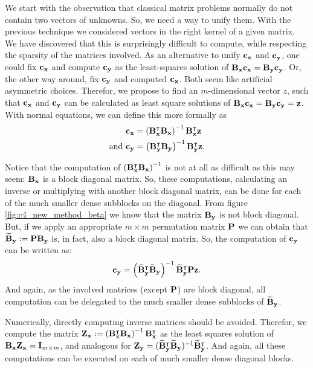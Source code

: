 We start with the observation that classical matrix problems normally do not contain two vectors of unknowns. So, we need a way to unify them. With the previous technique we considered vectors in the right kernel of a given matrix. We have discovered that this is surprisingly difficult to compute, while respecting the sparsity of the matrices involved. As an alternative to unify $\vb{c_x}$ and $\vb{c_y}$, one could fix $\vb{c_x}$ and compute $\vb{c_y}$ as the least-squares solution of $\vb{B_x}\vb{c_x} = \vb{B_y}\vb{c_y}$. Or, the other way around, fix $\vb{c_y}$ and computed $\vb{c_x}$. Both seem like artificial asymmetric choices. Therefor, we propose to find an $m$-dimensional vector $z$, such that $\vb{c_x}$ and $\vb{c_y}$ can be calculated as least square solutions of $\vb{B_x}\vb{c_x} = \vb{B_y}\vb{c_y} = \vb{z}$. With normal equations, we can define this more formally as
\begin{align*}
    \vb{c_x}            & = \left(\vb{B_x^\intercal} \vb{B_x}\right)^{-1} \vb{B_x^\intercal} \vb{z}          \\
    \text{and }\vb{c_y} & = \left(\vb{B_y^\intercal} \vb{B_y}\right)^{-1} \vb{B_y^\intercal} \vb{z} \text{.}
\end{align*}

Notice that the computation of $\left(\vb{B_x^\intercal} \vb{B_x}\right)^{-1}$ is not at all as difficult as this may seem: $\vb{B_x}$ is a block diagonal matrix. So, these computations, calculating an inverse or multiplying with another block diagonal matrix, can be done for each of the much smaller dense subblocks on the diagonal. From figure \ref{fig:c4_new_method_beta} we know that the matrix $\vb{B_y}$ is not block diagonal. But, if we apply an appropriate $m \times m$ permutation matrix $\vb{P}$ we can obtain that $\vb{\widetilde{B}_y} := \vb{P} \vb{B_y}$ is, in fact, also a block diagonal matrix. So, the computation of $\vb{c_y}$ can be written as:
$$
    \vb{c_y} = \left(\vb{\widetilde{B}_y^\intercal} \vb{\widetilde{B}_y}\right)^{-1} \vb{\widetilde{B}^\intercal_y} \vb{P} \vb{z} \text{.}
$$
And again, as the involved matrices (except $\vb{P}$) are block diagonal, all computation can be delegated to the much smaller dense subblocks of $\vb{\widetilde{B}_y}$.

Numerically, directly computing inverse matrices should be avoided. Therefor, we compute the matrix $\vb{Z_x} := \left(\vb{B_x^\intercal} \vb{B_x}\right)^{-1} \vb{B_x^\intercal}$ as the least squares solution of $\vb{B_x} \vb{Z_x} = \vb{I}_{m \times m}$, and analogous for $\vb{Z_y} = (\vb{\widetilde{B}_y^\intercal} \vb{\widetilde{B}_y})^{-1} \vb{\widetilde{B}^\intercal_y}$. And again, all these computations can be executed on each of much smaller dense diagonal blocks.


